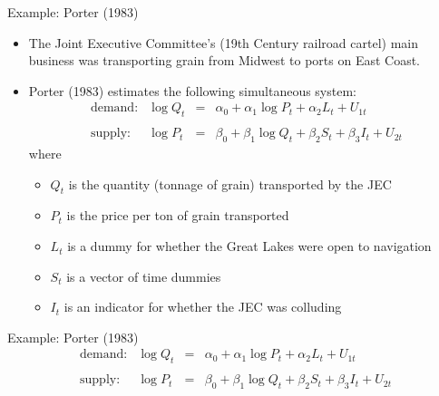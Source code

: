 \documentclass[aspectratio=169,11pt]{beamer}
\begin{document}
\begin{frame}{Example: Porter (1983)}
\begin{itemize}
	\item The Joint Executive Committee's (19th Century railroad cartel)
	main business was transporting grain from Midwest to ports on East Coast.

	\item Porter (1983) estimates the following simultaneous system:\[
\begin{array}{cccc}
\text{demand:} & \log Q_{t} & = & \alpha_{0}+\alpha_{1}\log P_{t}+\alpha_{2}L_{t}+U_{1t}\\
\\
\text{supply:} & \log P_{t} & = & \beta_{0}+\beta_{1}\log Q_{t}+\beta_{2}S_{t}+\beta_{3}I_{t}+U_{2t}
\end{array}
\]
where
\begin{itemize}
\item $Q_{t}$ is the quantity (tonnage of grain) transported by the JEC
\item $P_{t}$ is the price per ton of grain transported
\item $L_{t}$ is a dummy for whether the Great Lakes were open to navigation
\item $S_{t}$ is a vector of time dummies
\item $I_{t}$ is an indicator for whether the JEC was colluding
\end{itemize}
\end{itemize}
\end{frame}

\begin{frame}{Example: Porter (1983)}
\[
\begin{array}{rrcl}
	\text{demand:} & \log Q_{t} & = & \alpha_{0}+\alpha_{1}\log P_{t}+\alpha_{2}L_{t}+U_{1t}\\
\\
	\text{supply:} & \log P_{t} & = & \beta_{0}+\beta_{1}\log Q_{t}+\beta_{2}S_{t}+\beta_{3}I_{t}+U_{2t}
\end{array}
\]
\end{frame}
\end{document}
